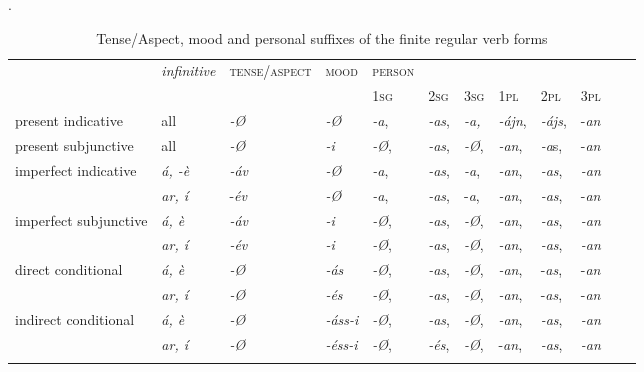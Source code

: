 \begin{sidewaystable}
	\caption{Tense/Aspect, mood and personal suffixes of the finite regular verb forms}
    \label{suffixesfiniteverbs}. 

	\begin{tabularx}{\textwidth}{p{4cm}lllllllllll}
		\lsptoprule
	& \textit{infinitive}	 &\textsc{tense/aspect} &\textsc{mood} &\textsc{person} \\
	& & & & \textsc{1sg} & \textsc{2sg} & \textsc{3sg} & \textsc{1pl} & \textsc{2pl} & \textsc{3pl} \\
		\midrule
		present indicative & all & \textit{-Ø} & \textit{-Ø} & \textit{-a}, & \textit{-as}, & \textit{-a,} & \textit{-ájn}, & \textit{-ájs}, & -\textit{an}\\
		present subjunctive & all & \textit{-Ø} & \textit{-i} & \textit{-Ø},& \textit{-as}, & \textit{-Ø}, & \textit{-an}, & \textit{-a}s, & -\textit{an}\\
		imperfect indicative &\textit{ á, -è} & \textit{-áv} & \textit{-Ø} & \textit{-a}, & \textit{-as}, & \textit{-a}, & \textit{-an}, & \textit{-as},  & \textit{-an}\\
		& \textit{ar, í} & -\textit{év} & \textit{-Ø} & \textit{-a}, & \textit{-as}, & -\textit{a}, & \textit{-an}, & \textit{-as}, & -\textit{an}\\
		imperfect subjunctive &\textit{ á, è} & \textit{-áv} & \textit{-i} & \textit{-Ø}, & \textit{-as}, & \textit{-Ø}, & \textit{-an}, & \textit{-as}, & \textit{-an}\\
		& \textit{ar, í} &\textit{-év} & \textit{-i} & \textit{-Ø}, & \textit{-as}, & \textit{-Ø}, & \textit{-an}, & \textit{-as}, & \textit{-an}\\
		direct conditional & \textit{á, è} & \textit{-Ø} & \textit{-ás} & \textit{-Ø}, &\textit{-as}, & \textit{-Ø}, & \textit{-an}, & -\textit{as}, & -\textit{an}\\
       &  \textit{ar, í} & \textit{-Ø} & \textit{-és} & \textit{-Ø}, &\textit{-as}, & \textit{-Ø}, & \textit{-an}, & -\textit{as}, & -\textit{an}\\
		indirect conditional & \textit{á, è} & \textit{-Ø} & \textit{-áss-i} &\textit{-Ø}, & \textit{-as}, &\textit{-Ø}, & \textit{-an}, & \textit{-as}, & \textit{-an}\\
		& \textit{ar, í} & \textit{-Ø} & \textit{-éss-i} & \textit{-Ø}, & \textit{-és}, & \textit{-Ø}, & -\textit{an}, & \textit{-as}, & \textit{-an}\\
	
				\lspbottomrule
	\end{tabularx}
\end{sidewaystable} 

